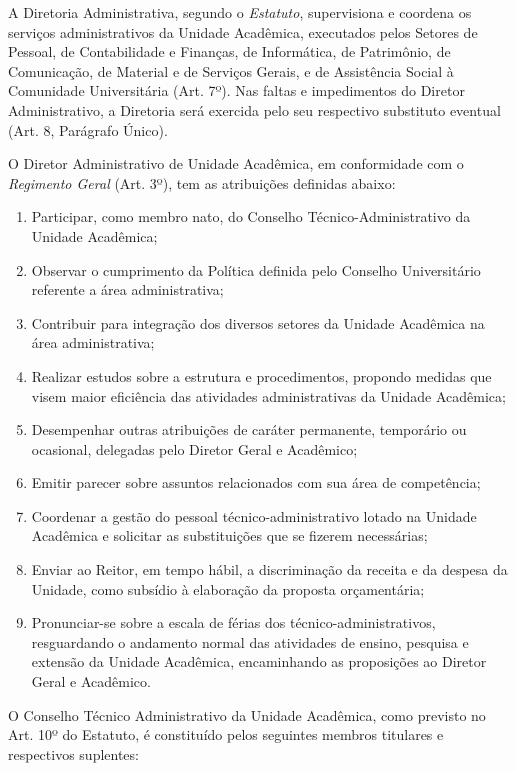 \documentclass[
	12pt,				%
	openright,			%
  oneside,     %
	a4paper,			%
 hyphens,
	chapter=TITLE,		%
	english,			%
	french,				%
	spanish,			%
	brazil				%
	]{abntex2}
\begin{document}
A Diretoria Administrativa, segundo o \textit{Estatuto}, supervisiona e coordena os serviços administrativos da Unidade Acadêmica, executados pelos Setores de Pessoal, de Contabilidade e Finanças, de Informática, de Patrimônio, de Comunicação, de Material e de Serviços Gerais, e de Assistência Social à Comunidade Universitária (Art. 7º). Nas faltas e impedimentos do Diretor Administrativo, a Diretoria será exercida pelo seu respectivo substituto eventual (Art. 8, Parágrafo Único).

O Diretor Administrativo de Unidade Acadêmica, em conformidade com o \textit{Regimento Geral} (Art. 3º), tem as atribuições definidas abaixo:

\begin{enumerate}
    \item Participar, como membro nato, do Conselho Técnico-Administrativo da Unidade Acadêmica;
    \item Observar o cumprimento da 	Política definida pelo Conselho Universitário referente a área administrativa;
    \item Contribuir para integração dos diversos setores da Unidade Acadêmica na área administrativa;
    \item Realizar estudos sobre a estrutura e procedimentos, propondo medidas que visem maior eficiência das atividades administrativas da Unidade Acadêmica;
    \item Desempenhar outras atribuições de caráter permanente, temporário ou ocasional, delegadas pelo Diretor Geral e Acadêmico;
    \item Emitir parecer sobre assuntos relacionados com sua área de competência;
    \item Coordenar a gestão do pessoal técnico-administrativo lotado na Unidade Acadêmica e solicitar as substituições que se fizerem necessárias;
    \item Enviar ao Reitor, em tempo 	hábil, a discriminação da receita e da despesa da Unidade, como subsídio à elaboração da proposta orçamentária; 
    \item Pronunciar-se sobre a escala de férias dos técnico-administrativos, resguardando o andamento 	normal das atividades de ensino, pesquisa e extensão da Unidade  Acadêmica, encaminhando as proposições ao Diretor Geral e Acadêmico.
\end{enumerate}

O Conselho Técnico Administrativo da Unidade Acadêmica, como previsto no Art. 10º do Estatuto, é constituído pelos seguintes membros titulares e respectivos suplentes:
\end{document}
